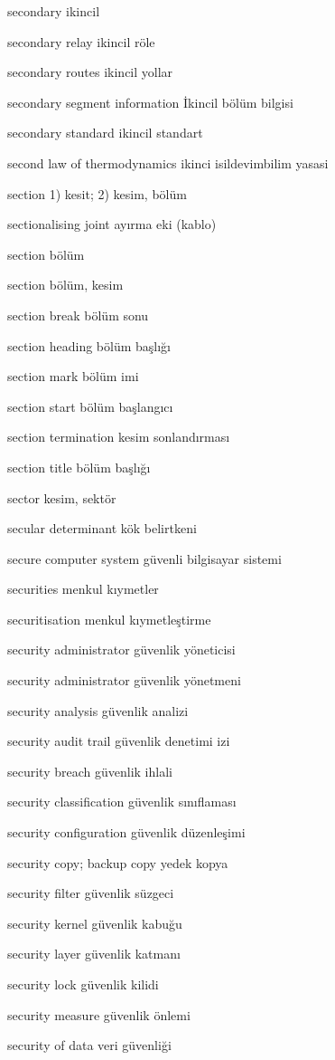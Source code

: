 \documentclass[12pt,fleqn]{article}\usepackage{../../common}
\begin{document}
secondary ikincil

secondary relay ikincil röle

secondary routes ikincil yollar

secondary segment information İkincil bölüm bilgisi

secondary standard ikincil standart

second law of thermodynamics ikinci isildevimbilim yasasi

section 1) kesit; 2) kesim, bölüm

sectionalising joint ayırma eki (kablo)

section bölüm

section bölüm, kesim

section break bölüm sonu

section heading bölüm başlığı

section mark bölüm imi

section start bölüm başlangıcı

section termination kesim sonlandırması

section title bölüm başlığı

sector kesim, sektör

secular determinant kök belirtkeni

secure computer system güvenli bilgisayar sistemi

securities menkul kıymetler

securitisation menkul kıymetleştirme

security administrator güvenlik yöneticisi

security administrator güvenlik yönetmeni

security analysis güvenlik analizi

security audit trail güvenlik denetimi izi

security breach güvenlik ihlali

security classification güvenlik sınıflaması

security configuration güvenlik düzenleşimi

security copy; backup copy yedek kopya

security filter güvenlik süzgeci

security kernel güvenlik kabuğu

security layer güvenlik katmanı

security lock güvenlik kilidi

security measure güvenlik önlemi

security of data veri güvenliği
\end{document}
